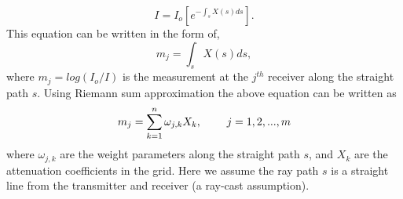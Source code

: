 \documentclass[12pt,A4]{article}
\begin{document}
\begin{equation}
I=I_{o}\left[e^{-\int_{s} X(s)ds}\right].
\end{equation}
This equation can be written in the form of,
\begin{equation}
m_{j}=\int_{s}X(s)ds,
\end{equation}  
where $m_{j}=log(I_{o}/I)$ is the measurement at the $j^{th}$ receiver along the straight path $s$.
Using Riemann sum approximation the above equation can be written as
\begin{equation}
m_{j}=\sum_{k=1}^{n}\omega_{j,k}X_{k},\hspace{0.8cm}j=1,2,...,m
\end{equation}
where $\omega_{j,k}$ are the weight parameters along the straight path $s$, and $X_{k}$ are the attenuation coefficients in the grid. Here we assume the ray path $s$ is a straight line from the transmitter and receiver (a ray-cast assumption).
\end{document}
